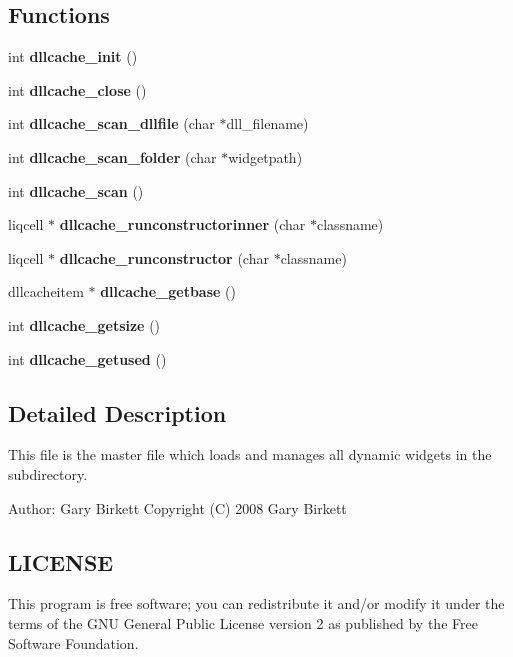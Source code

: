 \subsection*{Functions}
\begin{CompactItemize}
\item 
int {\bf dllcache\_\-init} ()
\item 
int {\bf dllcache\_\-close} ()
\item 
int \textbf{dllcache\_\-scan\_\-dllfile} (char $\ast$dll\_\-filename)\label{d4/d58/liqcell__dllcache_8c_f4e056c0c2b19bda38b3d5157bd7ee0d}

\item 
int \textbf{dllcache\_\-scan\_\-folder} (char $\ast$widgetpath)\label{d4/d58/liqcell__dllcache_8c_7a0c58383c34247f8e4279a62fd78e14}

\item 
int {\bf dllcache\_\-scan} ()
\item 
liqcell $\ast$ \textbf{dllcache\_\-runconstructorinner} (char $\ast$classname)\label{d4/d58/liqcell__dllcache_8c_38bc91eaf35e744083278b67d6397cb2}

\item 
liqcell $\ast$ {\bf dllcache\_\-runconstructor} (char $\ast$classname)
\item 
dllcacheitem $\ast$ \textbf{dllcache\_\-getbase} ()\label{d4/d58/liqcell__dllcache_8c_8050fd87805acbcf6f7fc4caad423f28}

\item 
int \textbf{dllcache\_\-getsize} ()\label{d4/d58/liqcell__dllcache_8c_e364073ee08c733f9be5acb008bb17c2}

\item 
int \textbf{dllcache\_\-getused} ()\label{d4/d58/liqcell__dllcache_8c_b4ae9856d634388cb1c465b69716e9ec}

\end{CompactItemize}


\label{_details}
\subsection{Detailed Description}
This file is the master file which loads and manages all dynamic widgets in the subdirectory. 

\begin{Desc}
\item[Author:]Gary Birkett Copyright (C) 2008 Gary Birkett\end{Desc}
\subsection{LICENSE}\label{d7/db4/liqcell__prop_8c_LICENSE}
This program is free software; you can redistribute it and/or modify it under the terms of the GNU General Public License version 2 as published by the Free Software Foundation.


